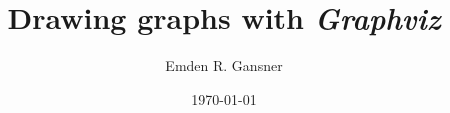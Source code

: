 \documentclass[11pt]{article}
\date{\today}
\def\gviz{{\it Graphviz}}
\begin{document}

\author{Emden R. Gansner}
\title{Drawing graphs with \gviz}
\maketitle

\newpage
\tableofcontents
\newpage







%
%

\clearpage


\appendix
\clearpage



\end{document}
